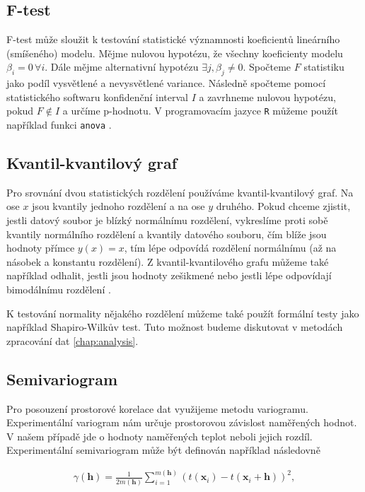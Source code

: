 \subsection{F-test}
F-test může sloužit k testování statistické významnosti koeficientů lineárního (smíšeného) modelu. Mějme nulovou hypotézu, že všechny koeficienty modelu $\beta_i = 0\, \forall i$. Dále mějme alternativní hypotézu $\exists j, \beta_j\neq 0$. Spočteme $F$ statistiku jako podíl vysvětlené a nevysvětlené variance. Následně spočteme pomocí statistického softwaru konfidenční interval $I$ a zavrhneme nulovou hypotézu, pokud $F\notin I$ a určíme p-hodnotu. V programovacím jazyce \texttt{R} můžeme použít například funkci \texttt{anova} \parencite{ftest}.

\subsection{Kvantil-kvantilový graf}
Pro srovnání dvou statistických rozdělení používáme kvantil-kvantilový graf. Na ose $x$ jsou kvantily jednoho rozdělení a na ose $y$ druhého. Pokud chceme zjistit, jestli datový soubor je blízký normálnímu rozdělení, vykreslíme proti sobě kvantily normálního rozdělení a kvantily datového souboru, čím blíže jsou hodnoty přímce $y(x)=x$, tím lépe odpovídá rozdělení normálnímu (až na násobek a konstantu rozdělení). Z kvantil-kvantilového grafu můžeme také například odhalit, jestli jsou hodnoty zešikmené nebo jestli lépe odpovídají bimodálnímu rozdělení \parencite{interpretqqplot}.

K testování normality nějakého rozdělení můžeme také použít formální testy jako například Shapiro-Wilkův test. Tuto možnost budeme diskutovat v metodách zpracování dat \ref{chap:analysis}. %

\subsection{Semivariogram}\label{chap:variogram}
Pro posouzení prostorové korelace dat využijeme metodu variogramu. Experimentální variogram nám určuje prostorovou závislost naměřených hodnot. V našem případě jde o hodnoty naměřených teplot neboli jejich rozdíl. Experimentální semivariogram může být definován například následovně

\begin{gather*}
	\gamma(\mathbf{h}) = \frac{1}{2m(\mathbf{h})}\sum_{i=1}^{m(\mathbf{h})}\left(t(\mathbf{x}_i) - t(\mathbf{x}_i+\mathbf{h})\right)^2,
\end{gather*}

